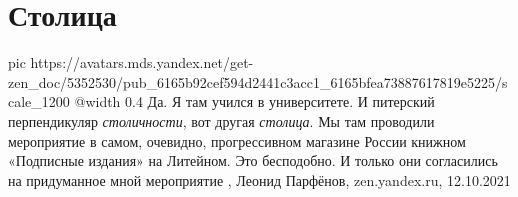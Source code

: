  
 
 
 
 
\chapter{Столица}

\ifcmt
  pic https://avatars.mds.yandex.net/get-zen_doc/5352530/pub_6165b92cef594d2441c3acc1_6165bfea73887617819e5225/scale_1200
  @width 0.4
\fi
Да. Я там учился в университете. И питерский перпендикуляр \emph{столичности}, вот
другая \emph{столица}. Мы там проводили мероприятие в самом, очевидно, прогрессивном
магазине России книжном «Подписные издания» на Литейном. Это бесподобно. И
только они согласились на придуманное мной мероприятие
, Леонид Парфёнов, zen.yandex.ru, 12.10.2021
